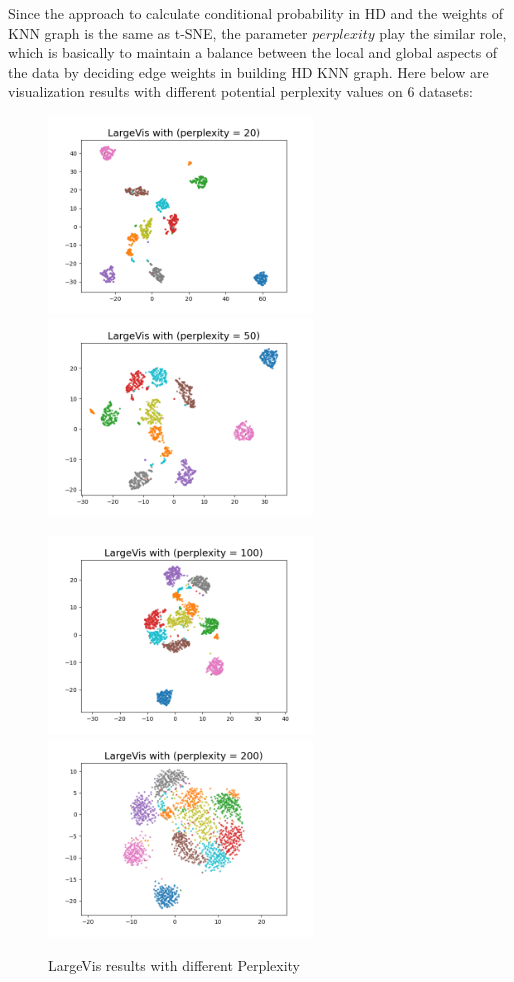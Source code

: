 Since the approach to calculate conditional probability in HD and the weights of KNN graph is the same as t-SNE, the parameter $perplexity$ play the similar role, which is basically to maintain a balance between the local and global aspects of the data by deciding edge weights in building HD KNN graph. Here below are visualization results with different potential perplexity values on 6 datasets:

\begin{figure}[H]
\centering  %
{
\label{Fig.sub.1}
\includegraphics[width=7cm,height=4cm\textwidth]{images/largevis/image_largevis_perp20.png}}
{
\label{Fig.sub.2}
\includegraphics[width=7cm,height=4cm\textwidth]{images/largevis/image_largevis_perp50.png}}
\end{figure}

\begin{figure}[H]
\centering  %
{
\label{Fig.sub.1}
\includegraphics[width=7cm,height=4cm\textwidth]{images/largevis/image_largevis_perp100.png}}
{
\label{Fig.sub.2}
\includegraphics[width=7cm,height=4cm\textwidth]{images/largevis/image_largevis_perp200.png}}
\caption{LargeVis results with different Perplexity}
\end{figure}

